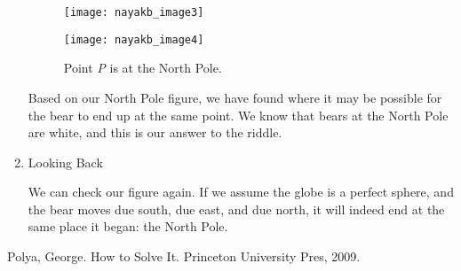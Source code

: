 \begin{enumerate}
\begin{figure}[!htb]
   \begin{minipage}{0.48\textwidth}
     \centering
     \texttt{[image: nayakb\_image3]}
     \caption{Point \emph{P} is 1 mile north of the South Pole.}\label{Fig:Data1}
   \end{minipage}\hfill
   \begin{minipage}{0.48\textwidth}
     \centering
     \texttt{[image: nayakb\_image4]}
     \caption{Point \emph{P} is at the North Pole.}\label{Fig:Data2}
   \end{minipage}
\end{figure}
   
   Based on our North Pole figure, we have found where it may be possible for the bear to end up at the same point. We know that bears at the North Pole are white, and this is our answer to the riddle.



   \pagebreak
   
   \vspace*{0.5cm}
   
   \item Looking Back
   
   We can check our figure again. If we assume the globe is a perfect sphere, and the bear moves due south, due east, and due north, it will indeed end at the same place it began: the North Pole.
   
\end{enumerate}

\pagebreak
\begin{thebibliography}{1}

\bibitem{} 
Polya, George. How to Solve It. Princeton University Pres, 2009.

\end{thebibliography}
